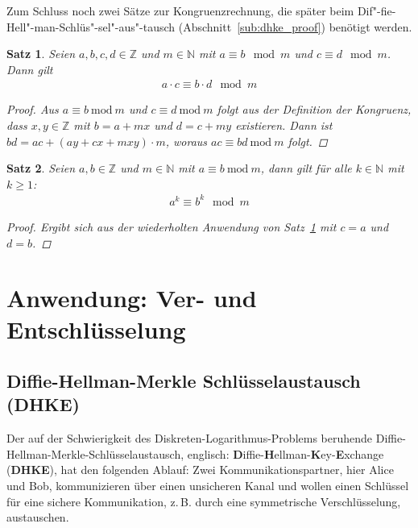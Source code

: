 \documentclass[
  a4paper,
  11pt,
]{scrartcl}
\theoremstyle{plain}
\newtheorem{satz}{Satz}
\theoremstyle{definition}
\theoremstyle{remark}
\newcommand{\N}{\mathbb{N}}
\newcommand{\Z}{\mathbb{Z}}
\newcommand{\Mod}[1]{\ \mathrm{mod}\ #1}
\begin{document}
Zum Schluss noch zwei Sätze zur Kongruenzrechnung, die später beim
Dif"-fie-Hell"-man-Schlüs"-sel"-aus"-tausch (Abschnitt~\ref{sub:dhke_proof})
benötigt werden.

\begin{satz}\label{satz:multiplikation_modulo}
  Seien $a,b,c,d \in \Z$ und $m \in \N$ mit $a \equiv b \mod m$ und $c \equiv d
  \mod m$. Dann gilt
  \begin{align*}
    a \cdot c \equiv b \cdot d \mod m
  \end{align*}
  \begin{proof}
    Aus $a \equiv b \Mod{m}$ und $c \equiv d \Mod{m}$ folgt aus der Definition
    der Kongruenz, dass $x, y \in \Z$ mit $b = a+mx$ und $d = c+my$ existieren.
    Dann ist $bd = ac + (ay + cx + mxy) \cdot m$, woraus $ac \equiv bd \Mod{m}$
    folgt.
  \end{proof}
\end{satz}

\begin{satz}\label{satz:potenzen_bei_kongruenzen}
  Seien $a, b \in \Z$ und $m \in \N$ mit $a \equiv b \Mod{m}$, dann gilt für
  alle $k \in \N$ mit $k \geq 1$:
  \begin{align*}
    a^k \equiv b^k \mod m
  \end{align*}
  \begin{proof}
    Ergibt sich aus der wiederholten Anwendung von
    Satz~\ref{satz:multiplikation_modulo} mit $c = a$ und $d = b$.
  \end{proof}
\end{satz}

\section{Anwendung: Ver- und Entschlüsselung}
\label{sec:anwendung_ver_und_entschlusselung}

\subsection{Diffie-Hellman-Merkle Schlüsselaustausch (DHKE)}
\label{sub:diffie_hellman_key_exchange}

Der auf der Schwierigkeit des Diskreten-Logarithmus-Problems beruhende
Diffie-Hellman-Merkle-Schlüsselaustausch, englisch:
\textbf{D}iffie-\textbf{H}ellman-\textbf{K}ey-\textbf{E}xchange (\textbf{DHKE}),
hat den folgenden Ablauf:
Zwei Kommunikationspartner, hier Alice und Bob, kommunizieren über einen
unsicheren Kanal und wollen einen Schlüssel für eine sichere Kommunikation,
z.\,B. durch eine symmetrische Verschlüsselung, austauschen.
\end{document}
